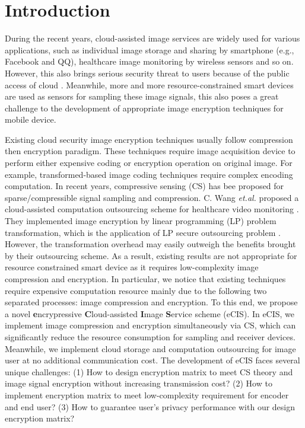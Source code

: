 \documentclass[conference]{IEEEtran}
\begin{document}
\section{Introduction}
During the recent years, cloud-assisted image services are widely used for various applications, such as individual image storage and sharing by smartphone (e.g., Facebook and QQ),  healthcare image monitoring by wireless sensors \cite{shoaib2011digital, alemdar2010wireless} and so on. However, this also brings serious security threat to users because of the public access of cloud \cite{armbrust2010view}. Meanwhile, more and more resource-constrained smart devices are used as sensors for sampling these image signals, this also poses a great challenge to the development of appropriate image encryption techniques for mobile device.


Existing cloud security image encryption techniques usually follow compression then encryption paradigm. These techniques require image acquisition device to perform either expensive coding or encryption operation \cite{liu2011image,wang2011new} on original image.
For example,  transformed-based image coding techniques require complex encoding computation.
In recent years, compressive sensing (CS) has bee proposed for sparse/compressible signal sampling and compression.  C. Wang \emph{et.al.} proposed a cloud-assisted computation outsourcing scheme for healthcare video monitoring \cite{wang2014privacy}.  They implemented image encryption by  linear programming (LP) problem transformation, which is the application of LP secure outsourcing problem \cite{wang2011secure}. However, the transformation overhead may easily outweigh the benefits brought by their outsourcing scheme. 
As a result, existing results are not appropriate for resource constrained smart device as it requires low-complexity image compression and encryption. In particular, we notice that existing techniques require expensive computation resource mainly due to the following two separated processes: image compression and encryption. To this end, we propose a novel \textbf{e}ncrypressive \textbf{C}loud-assisted \textbf{I}mage \textbf{S}ervice scheme (eCIS). In eCIS, we implement image compression and encryption simultaneously via CS, which can significantly reduce the resource consumption for sampling and receiver devices. Meanwhile, we implement cloud storage and computation outsourcing for image user at no additional communication cost. The development of eCIS faces several unique challenges:
(1) How to design encryption matrix  to meet  CS theory and image signal encryption  without increasing transmission cost?
(2) How to implement encryption matrix to meet low-complexity requirement for encoder and end user?
(3) How to guarantee user's privacy performance with our design encryption matrix?
\end{document}
